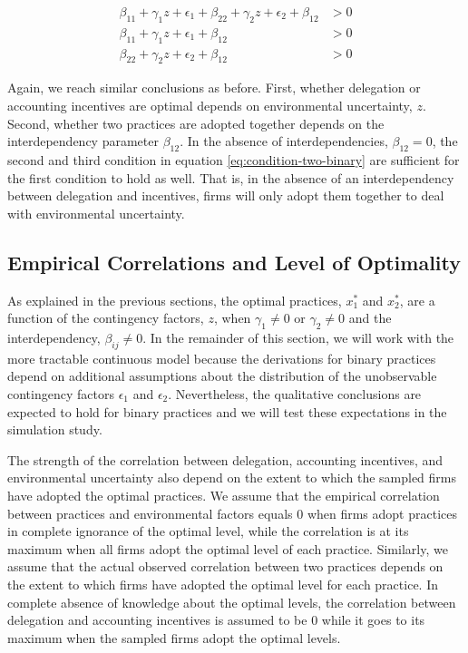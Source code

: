 \documentclass[12pt]{article}
\begin{document}
\begin{equation} \label{eq:condition-two-binary}
    \begin{aligned}
        \beta_{11} +  \gamma_1 z  + \epsilon_1
        + \beta_{22} + \gamma_2 z + \epsilon_2
        + \beta_{12}  &> 0 \\
        \beta_{11} + \gamma_1 z  + \epsilon_1 + \beta_{12}  &> 0 \\
        \beta_{22} + \gamma_2 z + \epsilon_2  + \beta_{12} &> 0 
    \end{aligned} 
\end{equation}

Again, we reach similar conclusions as before. First, whether delegation or accounting incentives are optimal depends on environmental uncertainty, $z$. Second, whether two practices are adopted together depends on the interdependency parameter $\beta_{12}$. In the absence of interdependencies, $\beta_{12} = 0$, the second and third condition in equation \eqref{eq:condition-two-binary} are sufficient for the first condition to hold as well. That is, in the absence of an interdependency between delegation and incentives, firms will only adopt them together to deal with environmental uncertainty.

\subsection{Empirical Correlations and Level of Optimality}

As explained in the previous sections, the optimal practices, $x^*_1$ and $x_2^*$, are a function of the contingency factors, $z$, when $\gamma_1 \neq 0$ or $\gamma_2 \neq 0$ and the interdependency, $\beta_{ij} \neq 0$. In the remainder of this section, we will work with the more tractable continuous model because the derivations for binary practices depend on additional assumptions about the distribution of the unobservable contingency factors $\epsilon_1$ and $\epsilon_2$. Nevertheless, the qualitative conclusions are expected to hold for binary practices and we will test these expectations in the simulation study.

The strength of the correlation between delegation, accounting incentives, and environmental uncertainty also depend on the extent to which the sampled firms have adopted the optimal practices. We assume that the empirical correlation between practices and environmental factors equals $0$ when firms adopt practices in complete ignorance of the optimal level, while the correlation is at its maximum when all firms adopt the optimal level of each practice. Similarly, we assume that the actual observed correlation between two practices depends on the extent to which firms have adopted the optimal level for each practice. In complete absence of knowledge about the optimal levels, the correlation between delegation and accounting incentives is assumed to be $0$ while it goes to its maximum when the sampled firms adopt the optimal levels. 
\end{document}
